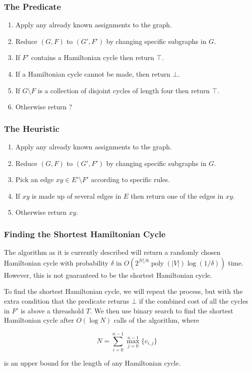 \documentclass[]{beamer}
\DeclareMathOperator{\poly}{poly}
\begin{document}
\begin{frame}
\frametitle{The Predicate}

\begin{enumerate}
\item Apply any already known assignments to the graph.
\item Reduce $(G, F)$ to $(G', F')$ by changing specific subgraphs in $G$.
\item If $F'$ contains a Hamiltonian cycle then return $\top$.
\item If a Hamiltonian cycle cannot be made, then return $\bot$.
\item If $G \setminus F$ is a collection of disjoint cycles of length four then return $\top$.
\item Otherwise return ?
\end{enumerate}
\end{frame}

\begin{frame}
\frametitle{The Heuristic}

\begin{enumerate}
\item Apply any already known assignments to the graph.
\item Reduce $(G, F)$ to $(G', F')$ by changing specific subgraphs in $G$.
\item Pick an edge $xy \in E' \setminus F'$ according to specific rules.
\item If $xy$ is made up of several edges in $E$ then return one of the edges in $xy$.
\item Otherwise return $xy$.
\end{enumerate}
\end{frame}

\begin{frame}
\frametitle{Finding the Shortest Hamiltonian Cycle}

The algorithm as it is currently described will return a randomly chosen Hamiltonian cycle with probability $\delta$ in $O(2^{|V|/6}\poly(|V|)\log(1/\delta))$ time. However, this is not guaranteed to be the shortest Hamiltonian cycle.

To find the shortest Hamiltonian cycle, we will repeat the process, but with the extra condition that the predicate returns $\bot$ if the combined cost of all the cycles in $F'$ is above a threashold $T$. We then use binary search to find the shortest Hamiltonian cycle after $O(\log N)$ calls of the algorithm, where

$$N = \sum_{i = 0}^{n-1}\max_{j = 0}^{n-1}\{c_{i,j}\}$$

is an upper bound for the length of any Hamiltonian cycle.
\end{frame}
\end{document}
